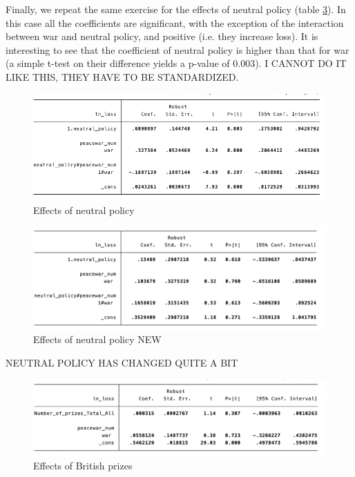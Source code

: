 \documentclass[12pt,a4paper,notitlepage,english]{article}
\begin{document}
Finally, we repeat the same exercise for the effects of neutral policy (table \ref{effects_neutral_policy}). In this case all the coefficients are significant, with the exception of the interaction between war and neutral policy, and positive (i.e. they increase loss). It is interesting to see that the coefficient of neutral policy is higher than that for war (a simple t-test on their difference yields a p-value of 0.003). I CANNOT DO IT LIKE THIS, THEY HAVE TO BE STANDARDIZED. \\
\begin{figure}
\centering
\caption{Effects of neutral policy}
\label{effects_neutral_policy}
\includegraphics[scale=.65]{reg3}
\end{figure}


\begin{figure}
	\centering
	\caption{Effects of neutral policy NEW}
	\label{effects_neutral_policy}
	\includegraphics[scale=.65]{reg_3_Neutral_Policy_NEW}
\end{figure}

NEUTRAL POLICY HAS CHANGED QUITE A BIT

\begin{figure}
	\centering
	\caption{Effects of British prizes}
	\label{effects_neutral_policy}
	\includegraphics[scale=.65]{reg_prizes}
\end{figure}
\end{document}
